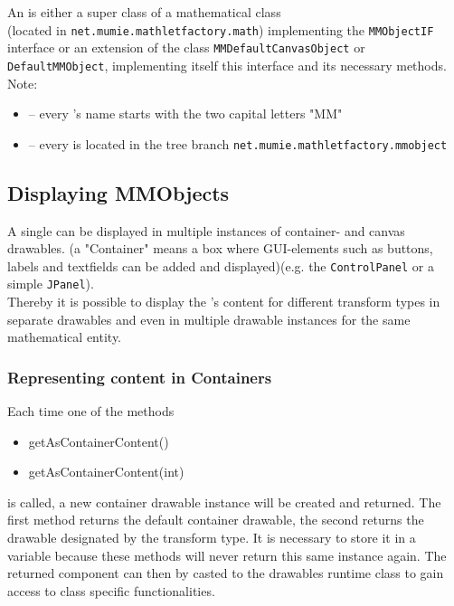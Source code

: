   An \mmo is either a super class of a mathematical class\\(located in \verb|net.mumie.mathletfactory.math|)
  implementing the \verb|MMObjectIF| interface or an extension of the class \verb|MMDefaultCanvasObject|
  or \verb|DefaultMMObject|, implementing 
  itself this interface and its necessary methods.\\
  Note: \\
  \begin{itemize}
    \item -- every \mmo's name starts with the two capital letters "MM"
    \item -- every \mmo is located in the tree branch \verb|net.mumie.mathletfactory.mmobject|
  \end{itemize}
  
  
\subsection{Displaying MMObjects}
  A single \mmo can be displayed in multiple instances of container- and canvas drawables.
  (a "Container" means a box where GUI-elements such as buttons, labels and textfields
  can be added and displayed)(e.g. the \verb|ControlPanel| or a simple \verb|JPanel|).\\
  Thereby it is possible to display the \mmo's content for different transform types
  in separate drawables and even in multiple drawable instances for the same mathematical entity.
  
 \subsubsection{Representing content in Containers}
    Each time one of the methods
     \begin{itemize}
      \item getAsContainerContent()
      \item getAsContainerContent(int)
    \end{itemize}
    is called, a new container drawable instance will be created and returned. The first
    method returns the default container drawable, the second returns the drawable designated
    by the transform type. It is necessary to store it in a variable because these
    methods will never return this same instance again. The returned component can
    then by casted to the drawables runtime class to gain access to class specific 
    functionalities.
  
